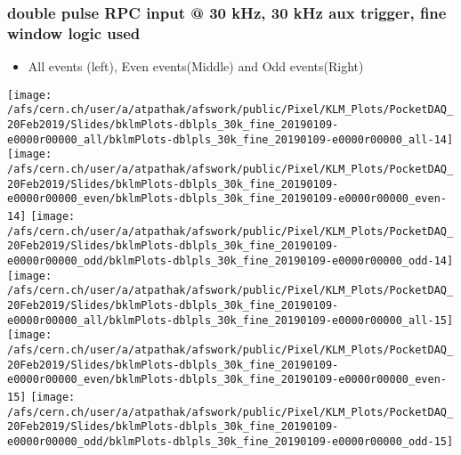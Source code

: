 \documentclass{beamer}
\begin{document}
\begin{frame}
\frametitle{\small double pulse RPC input @ 30 kHz, 30 kHz aux trigger, fine window logic used}
\vspace*{.05cm}
\begin{center}
 \begin{itemize}
\item { \small All events (left), Even events(Middle) and Odd events(Right)}
\end{itemize}
\begin{normalsize}

\vspace*{-.2cm}
\begin{center}

\texttt{[image: /afs/cern.ch/user/a/atpathak/afswork/public/Pixel/KLM\_Plots/PocketDAQ\_20Feb2019/Slides/bklmPlots-dblpls\_30k\_fine\_20190109-e0000r00000\_all/bklmPlots-dblpls\_30k\_fine\_20190109-e0000r00000\_all-14]}
\texttt{[image: /afs/cern.ch/user/a/atpathak/afswork/public/Pixel/KLM\_Plots/PocketDAQ\_20Feb2019/Slides/bklmPlots-dblpls\_30k\_fine\_20190109-e0000r00000\_even/bklmPlots-dblpls\_30k\_fine\_20190109-e0000r00000\_even-14]}
\texttt{[image: /afs/cern.ch/user/a/atpathak/afswork/public/Pixel/KLM\_Plots/PocketDAQ\_20Feb2019/Slides/bklmPlots-dblpls\_30k\_fine\_20190109-e0000r00000\_odd/bklmPlots-dblpls\_30k\_fine\_20190109-e0000r00000\_odd-14]} \\

\texttt{[image: /afs/cern.ch/user/a/atpathak/afswork/public/Pixel/KLM\_Plots/PocketDAQ\_20Feb2019/Slides/bklmPlots-dblpls\_30k\_fine\_20190109-e0000r00000\_all/bklmPlots-dblpls\_30k\_fine\_20190109-e0000r00000\_all-15]}
\texttt{[image: /afs/cern.ch/user/a/atpathak/afswork/public/Pixel/KLM\_Plots/PocketDAQ\_20Feb2019/Slides/bklmPlots-dblpls\_30k\_fine\_20190109-e0000r00000\_even/bklmPlots-dblpls\_30k\_fine\_20190109-e0000r00000\_even-15]}
\texttt{[image: /afs/cern.ch/user/a/atpathak/afswork/public/Pixel/KLM\_Plots/PocketDAQ\_20Feb2019/Slides/bklmPlots-dblpls\_30k\_fine\_20190109-e0000r00000\_odd/bklmPlots-dblpls\_30k\_fine\_20190109-e0000r00000\_odd-15]} \\

\end{center}
\end{normalsize}
\end{center}
\end{frame}
\end{document}
